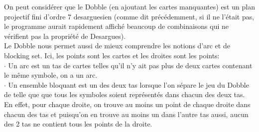 \documentclass[a4paper]{article}
\begin{document}
On peut considérer que le Dobble (en ajoutant les cartes manquantes) est un plan projectif fini d'ordre 7 desarguesien (comme dit précédemment, si il ne l'était pas, le programme aurait rapidement affiché beaucoup de combinaisons qui ne vérifient pas la propriété de Desargues).
\bigskip\\
Le Dobble nous permet aussi de mieux comprendre les notions d'arc et de blocking set. Ici, les points sont les cartes et les droites sont les points:\\
$\cdot$ Un arc est un tas de cartes telles qu'il n'y ait pas plus de deux cartes contenant le même symbole, on a un arc. \\
$\cdot$ Un ensemble bloquant est un des deux tas lorsque l'on sépare le jeu du Dobble de telle que que tous les symboles soient représentés dans chacun des deux tas. En effet, pour chaque droite, on trouve au moins un point de chaque droite dans chacun des tas et puisqu'on en trouve au moins un dans l'autre tas aussi, aucun des 2 tas ne contient tous les points de la droite.
\newpage
\end{document}
